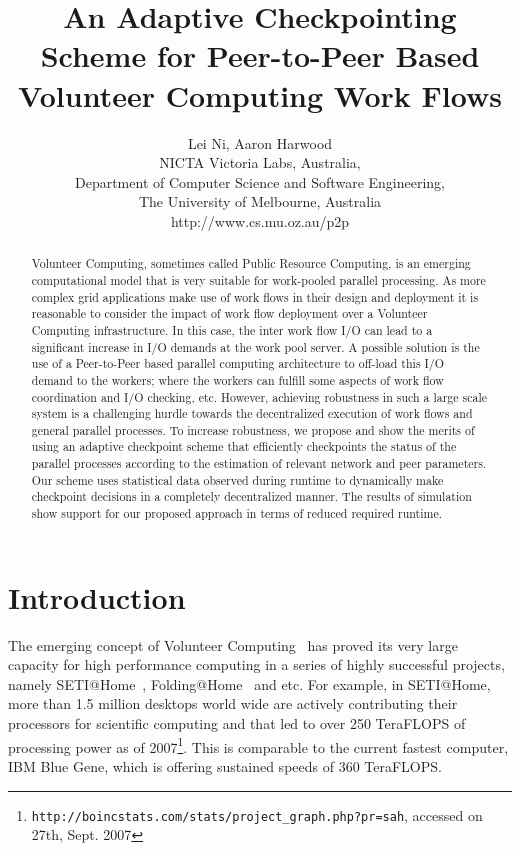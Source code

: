 \documentclass[times, 12pt, onecolumn]{article}
\begin{document}
\sloppypar

\title{An Adaptive Checkpointing Scheme for Peer-to-Peer Based Volunteer Computing Work Flows} 

\author{Lei Ni, Aaron Harwood \\
NICTA Victoria Labs,  Australia, \\
Department of Computer Science and Software Engineering, \\
The University of Melbourne, Australia \\
{http://www.cs.mu.oz.au/p2p}}


\maketitle 
\begin{abstract} 
Volunteer Computing, sometimes called Public Resource Computing, is an emerging
computational model that is very suitable for work-pooled parallel processing.
As more complex grid applications make use of work flows in their design and
deployment it is reasonable to consider the impact of work flow deployment over
a Volunteer Computing infrastructure. In this case, the inter work flow I/O can
lead to a significant increase in I/O demands at the work pool server. A
possible solution is the use of a Peer-to-Peer based parallel computing
architecture to off-load this I/O demand to the workers; where the workers can
fulfill some aspects of work flow coordination and I/O checking, etc.  However,
achieving robustness in such a large scale system is a challenging hurdle
towards the decentralized execution of work flows and general parallel
processes. To increase robustness, we propose and show the merits of using an
adaptive checkpoint scheme that efficiently checkpoints the status of the
parallel processes according to the estimation of relevant network and peer
parameters. Our scheme uses statistical data observed during runtime to
dynamically make checkpoint decisions in a completely decentralized manner. The
results of simulation show support for our proposed approach in terms of
reduced required runtime.     
\end{abstract} 

\section{Introduction}
The emerging concept of Volunteer Computing~\cite{935629, volunteercomputing}
has proved its very large capacity for high performance computing in a series
of highly successful projects, namely SETI@Home~\cite{setiathome},
Folding@Home~\cite{larson-2003} and etc. For example, in SETI@Home, more than
1.5 million desktops world wide are actively contributing their processors for scientific
computing and that led to over 250 TeraFLOPS of processing power as of
2007\footnote{{\tt http://boincstats.com/stats/project\_graph.php?pr=sah},
accessed on 27th, Sept. 2007}. This is comparable to the current fastest computer, 
IBM Blue Gene, which is offering sustained speeds of 360 TeraFLOPS.
\end{document}
